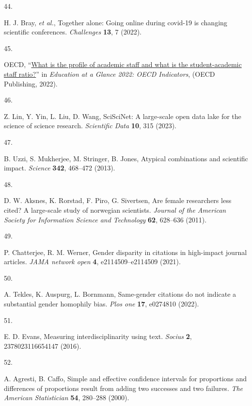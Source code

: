 \documentclass[
  11pt, %
]{article}
\newlength{\cslhangindent}
\newlength{\csllabelwidth}
\newenvironment{CSLReferences}[2] %
 {\begin{list}{}{%
  \setlength{\itemindent}{0pt}
  \setlength{\leftmargin}{0pt}
  \setlength{\parsep}{0pt}
  \ifodd #1
   \setlength{\leftmargin}{\cslhangindent}
   \setlength{\itemindent}{-1\cslhangindent}
  \fi
  \setlength{\itemsep}{#2\baselineskip}}}
 {\end{list}}
\newcommand{\CSLLeftMargin}[1]{\parbox[t]{\csllabelwidth}{\strut#1\strut}}
\newcommand{\CSLRightInline}[1]{\parbox[t]{\linewidth - \csllabelwidth}{\strut#1\strut}}
\begin{document}
\begin{CSLReferences}{0}{1}
\CSLLeftMargin{44. }%
\CSLRightInline{H. J. Bray, \emph{et al.}, Together alone: Going online during covid-19 is changing scientific conferences. \emph{Challenges} \textbf{13}, 7 (2022).}

\CSLLeftMargin{45. }%
\CSLRightInline{OECD, {``\href{https://doi.org/10.1787/bb6ee273-en}{What is the profile of academic staff and what is the student-academic staff ratio?}''} in \emph{Education at a Glance 2022: OECD Indicators}, (OECD Publishing, 2022).}

\CSLLeftMargin{46. }%
\CSLRightInline{Z. Lin, Y. Yin, L. Liu, D. Wang, SciSciNet: A large-scale open data lake for the science of science research. \emph{Scientific Data} \textbf{10}, 315 (2023).}

\CSLLeftMargin{47. }%
\CSLRightInline{B. Uzzi, S. Mukherjee, M. Stringer, B. Jones, Atypical combinations and scientific impact. \emph{Science} \textbf{342}, 468--472 (2013).}

\CSLLeftMargin{48. }%
\CSLRightInline{D. W. Aksnes, K. Rorstad, F. Piro, G. Sivertsen, Are female researchers less cited? A large-scale study of norwegian scientists. \emph{Journal of the American Society for Information Science and Technology} \textbf{62}, 628--636 (2011).}

\CSLLeftMargin{49. }%
\CSLRightInline{P. Chatterjee, R. M. Werner, Gender disparity in citations in high-impact journal articles. \emph{JAMA network open} \textbf{4}, e2114509--e2114509 (2021).}

\CSLLeftMargin{50. }%
\CSLRightInline{A. Tekles, K. Auspurg, L. Bornmann, Same-gender citations do not indicate a substantial gender homophily bias. \emph{Plos one} \textbf{17}, e0274810 (2022).}

\CSLLeftMargin{51. }%
\CSLRightInline{E. D. Evans, Measuring interdisciplinarity using text. \emph{Socius} \textbf{2}, 2378023116654147 (2016).}

\CSLLeftMargin{52. }%
\CSLRightInline{A. Agresti, B. Caffo, Simple and effective confidence intervals for proportions and differences of proportions result from adding two successes and two failures. \emph{The American Statistician} \textbf{54}, 280--288 (2000).}


\end{CSLReferences}
\end{document}
